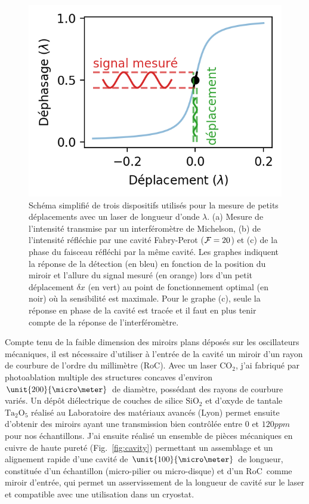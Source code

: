 \documentclass[12pt,a4paper]{article}
\newcommand{\uroc}{\micro RoC}
\begin{document}
\begin{figure}
\includegraphics[scale=0.75]{figures/cavity_phase_response.png}
\caption{Schéma simplifié de trois dispositifs utilisés pour la mesure de petits déplacements avec un laser de longueur d'onde $\lambda$.
(a) Mesure de l'intensité transmise par un interféromètre de Michelson, (b) de l'intensité réfléchie par une cavité Fabry-Perot (${\cal{F}}=20$) et (c) de la phase du faisceau réfléchi par la même cavité.
Les graphes indiquent la réponse de la détection (en bleu) en fonction de la position du miroir et l'allure du signal mesuré (en orange) lors d'un petit déplacement $\delta x$ (en vert) au point de fonctionnement optimal (en noir) où la sensibilité est maximale.
Pour le graphe (c), seule la réponse en phase de la cavité est tracée et il faut en plus tenir compte de la réponse de l'interféromètre.}
\label{fig:detection_scheme}
\end{figure}

Compte tenu de la faible dimension des miroirs plans déposés sur les oscillateurs mécaniques, il est nécessaire d'utiliser à l'entrée de la cavité un miroir d'un rayon de courbure de l'ordre du millimètre (\uroc).
Avec un laser $\mathrm{CO_2}$, j'ai fabriqué par photoablation multiple des structures concaves d'environ $\unit{200}{\micro\meter}$ de diamètre, possédant des rayons de courbure variés.
Un dépôt diélectrique de couches de silice $\mathrm{SiO_2}$ et d'oxyde de tantale $\mathrm{Ta_2O_5}$ réalisé au Laboratoire des matériaux avancés (Lyon) permet ensuite d'obtenir des miroirs ayant une transmission bien contrôlée entre 0 et $\unit{120}{ppm}$ pour nos échantillons.
J'ai ensuite réalisé un ensemble de pièces mécaniques en cuivre de haute pureté (Fig.~\ref{fig:cavity}) permettant un assemblage et un alignement rapide d'une cavité de $\unit{100}{\micro\meter}$ de longueur, constituée d'un échantillon (micro-pilier ou micro-disque) et d'un \uroc\ comme miroir d'entrée, qui permet un asservissement de la longueur de cavité sur le laser et compatible avec une utilisation dans un cryostat.
\end{document}
